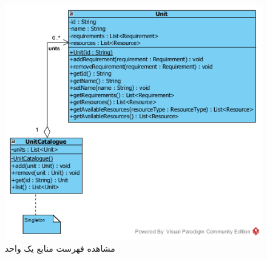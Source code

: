 \begin{landscape}
\begin{figure}[H]
	\includegraphics[scale=0.7]{img/sequence-design/ViewListOfResourcesC}
	\caption{مشاهده فهرست منابع یک واحد}
\end{figure}

\newpage

\end{landscape}
